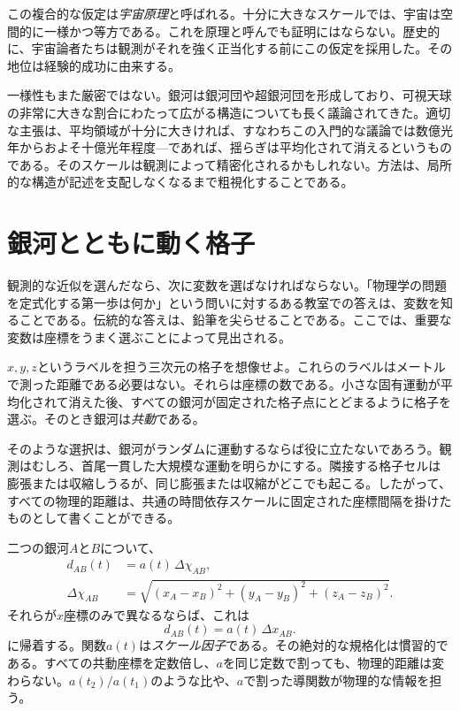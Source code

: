 この複合的な仮定は\emph{宇宙原理}と呼ばれる。十分に大きなスケールでは、宇宙は空間的に一様かつ等方である。これを原理と呼んでも証明にはならない。歴史的に、宇宙論者たちは観測がそれを強く正当化する前にこの仮定を採用した。その地位は経験的成功に由来する。

一様性もまた厳密ではない。銀河は銀河団や超銀河団を形成しており、可視天球の非常に大きな割合にわたって広がる構造についても長く議論されてきた。適切な主張は、平均領域が十分に大きければ、すなわちこの入門的な議論では数億光年からおよそ十億光年程度---であれば、揺らぎは平均化されて消えるというものである。そのスケールは観測によって精密化されるかもしれない。方法は、局所的な構造が記述を支配しなくなるまで粗視化することである。

\begin{classroomqa}
\end{classroomqa}

\section{銀河とともに動く格子}

観測的な近似を選んだなら、次に変数を選ばなければならない。「物理学の問題を定式化する第一歩は何か」という問いに対するある教室での答えは、変数を知ることである。伝統的な答えは、鉛筆を尖らせることである。ここでは、重要な変数は座標をうまく選ぶことによって見出される。

\(x,y,z\)というラベルを担う三次元の格子を想像せよ。これらのラベルはメートルで測った距離である必要はない。それらは座標の数である。小さな固有運動が平均化されて消えた後、すべての銀河が固定された格子点にとどまるように格子を選ぶ。そのとき銀河は\emph{共動}である。

そのような選択は、銀河がランダムに運動するならば役に立たないであろう。観測はむしろ、首尾一貫した大規模な運動を明らかにする。隣接する格子セルは膨張または収縮しうるが、同じ膨張または収縮がどこでも起こる。したがって、すべての物理的距離は、共通の時間依存スケールに固定された座標間隔を掛けたものとして書くことができる。

二つの銀河\(A\)と\(B\)について、
\begin{equation}
\begin{aligned}
d_{AB}(t)&=a(t)\,\Delta\chi_{AB},\\
\Delta\chi_{AB}
&=\sqrt{(x_A-x_B)^2+(y_A-y_B)^2+(z_A-z_B)^2}.
\end{aligned}
\label{eq:c01-physical-distance}
\end{equation}
それらが\(x\)座標のみで異なるならば、これは
\begin{equation}
d_{AB}(t)=a(t)\,\Delta x_{AB}.
\end{equation}
に帰着する。関数\(a(t)\)は\emph{スケール因子}である。その絶対的な規格化は慣習的である。すべての共動座標を定数倍し、\(a\)を同じ定数で割っても、物理的距離は変わらない。\(a(t_2)/a(t_1)\)のような比や、\(a\)で割った導関数が物理的な情報を担う。

